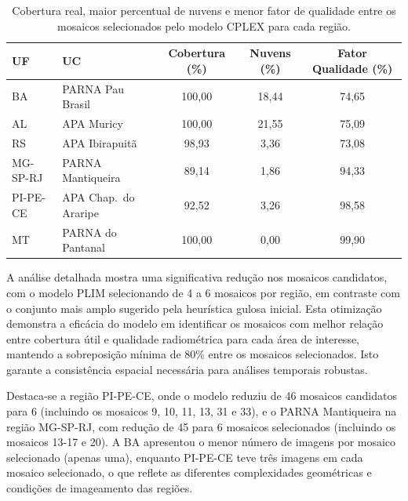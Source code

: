 \documentclass[a4paper,11pt]{article}
\begin{document}
\vspace{-6mm}
\begin{table}[H]
    \centering
    \caption{Cobertura real, maior percentual de nuvens e menor fator de qualidade entre os mosaicos selecionados pelo modelo CPLEX para cada região.}
    \label{tab:cobertura_comparacao}
    \footnotesize
    \begin{adjustbox}{width=\textwidth}
    \begin{tabular}{llccc}
        \toprule
        \textbf{UF} & \textbf{UC} & \textbf{Cobertura (\%)} & \textbf{Nuvens (\%)} & \textbf{Fator Qualidade (\%)} \\
        \midrule
        BA      & PARNA Pau Brasil         & 100,00 & 18,44 & 74,65 \\
        AL      & APA Muricy               & 100,00 & 21,55 & 75,09 \\
        RS      & APA Ibirapuitã           & 98,93  & 3,36  & 73,08 \\
        MG-SP-RJ& PARNA Mantiqueira        & 89,14  & 1,86  & 94,33 \\
        PI-PE-CE& APA Chap.\ do Araripe    & 92,52  & 3,26  & 98,58 \\
        MT      & PARNA do Pantanal        & 100,00 & 0,00  & 99,90 \\
        \bottomrule
    \end{tabular}
    \end{adjustbox}
    \normalsize
\end{table}
\vspace{-5mm}

A análise detalhada mostra uma significativa redução nos mosaicos candidatos, com o modelo PLIM selecionando de 4 a 6 mosaicos por região, em contraste com o conjunto mais amplo sugerido pela heurística gulosa inicial. Esta otimização demonstra a eficácia do modelo em identificar os mosaicos com melhor relação entre cobertura útil e qualidade radiométrica para cada área de interesse, mantendo a sobreposição mínima de 80\% entre os mosaicos selecionados. Isto garante a consistência espacial necessária para análises temporais robustas.

Destaca-se a região PI-PE-CE, onde o modelo reduziu de 46 mosaicos candidatos para 6 (incluindo os mosaicos 9, 10, 11, 13, 31 e 33), e o PARNA Mantiqueira na região MG-SP-RJ, com redução de 45 para 6 mosaicos selecionados (incluindo os mosaicos 13-17 e 20). A BA apresentou o menor número de imagens por mosaico selecionado (apenas uma), enquanto PI-PE-CE teve três imagens em cada mosaico selecionado, o que reflete as diferentes complexidades geométricas e condições de imageamento das regiões.
\end{document}
